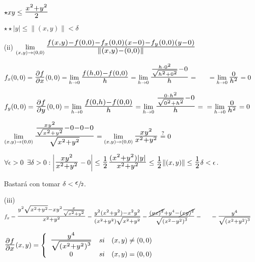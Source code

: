 \documentclass[10pt, titlepage]{article}
\newcommand{\eqc}[1]{\stackrel{\mathclap{\normalfont\mbox{\scriptsize{#1}}}}{=}}
\newcommand{\bfrac}[2]{\scalebox{1.4}{$\frac{#1}{#2}$}}
\newcommand{\spac}{\, \, \,}
\begin{document}
$\star xy \leq \bfrac{x^2 + y^2}{2}$
\vspace{2mm}

$\star \star |y| \leq \|(x, y)\| < \delta$
\vspace{5mm}

(ii) $\displaystyle \lim_{(x, y) \to (0, 0)} \bfrac{f (x, y) - f (0, 0) - f_x (0, 0) (x - 0) - f_y (0, 0) (y - 0)}{\|(x, y) 
- (0, 0)\|}$
\vspace{5mm}

$f_x (0, 0) = \bfrac{\partial f}{\partial x} (0, 0) = \displaystyle \lim_{h \to 0} \bfrac{f (h, 0) - f (0, 0)}{h} = 
\lim_{h \to 0} \bfrac{\frac{h \cdot 0^2}{\sqrt{h^2 + 0^2}} - 0}{h} = \\ \indent = \lim_{h \to 0} \bfrac{0}{h^2} = 0$
\vspace{3mm}

$f_y (0, 0) = \bfrac{\partial f}{\partial y} (0, 0)= \displaystyle \lim_{h \to 0} \bfrac{f (0, h) - f (0, 0)}{h} = 
\lim_{h \to 0} \bfrac{\frac{0 \cdot h^2}{\sqrt{0^2 + h^2}} - 0}{h} = \\ = \lim_{h \to 0}  \bfrac{0}{h^2} = 
0$
\vspace{3mm}

$\displaystyle \lim_{(x, y) \to (0, 0)} \bfrac{\frac{xy^2}{\sqrt{x^2 + y^2}} - 0 - 0 - 0}{\sqrt{x^2 + y^2}} = 
\lim_{(x, y) \to (0, 0)} \bfrac{xy^2}{x^2 + y^2} \eqc{?} 0$
\vspace{3mm}

$\forall \epsilon >0 \spac \exists \delta > 0 : \left | \bfrac{xy^2}{x^2 + y^2} - 0 \right | \leq \bfrac{1}{2} 
\bfrac{(x^2 + y^2) |y|}{x^2 + y^2} \leq \bfrac{1}{2} \|(x, y)\| \leq \bfrac{1}{2} \delta < \epsilon$. \\
\vspace{3mm}

Bastará con tomar $\delta < \sfrac{\scalebox{1.5}{$\epsilon$}}{2}$.
\vspace{5mm}

(iii) $f_x = \bfrac{y^2 \sqrt{x^2 + y^2} - xy^2 \frac{x}{\sqrt{x^2 + y^2}}}{x^2 + y^2} = 
\bfrac{y^2 (x^2 + y^2) - x^2y^2}{(x^2 + y^2) \sqrt{x^2 + y^2}} = \bfrac{\cancel{{(yx)}^2} + y^4 - \cancel{{(xy)^2}}}{\sqrt{{(x^2 - y^2)}^3}} = \\ \indent = \bfrac{y^4}{\sqrt{{(x^2 + y^2)}^3}}$
\vspace{3mm}

$\bfrac{\partial f}{\partial x} (x, y) = \left \{
\begin{array}{ccc}

\bfrac{y^4}{\sqrt{{(x^2 + y^2)}^3}} & si & (x, y) \neq (0, 0)\\
0 & si & (x, y) = (0, 0)\\

\end{array}\right .
$
\vspace{3mm}
\end{document}
